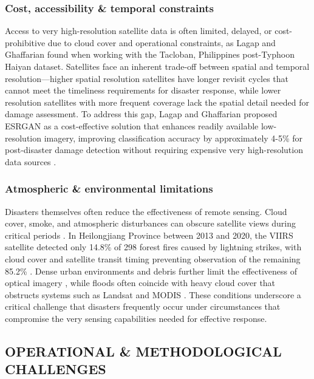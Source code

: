 \documentclass[conference,a4paper]{IEEEtran}
\begin{document}
\subsubsection{\textbf{Cost, accessibility \& temporal constraints}}
Access to very high-resolution satellite data is often limited, delayed, or cost-prohibitive due to cloud cover and operational constraints, as Lagap and Ghaffarian found when working with the Tacloban, Philippines post-Typhoon Haiyan dataset. Satellites face an inherent trade-off between spatial and temporal resolution—higher spatial resolution satellites have longer revisit cycles that cannot meet the timeliness requirements for disaster response, while lower resolution satellites with more frequent coverage lack the spatial detail needed for damage assessment. To address this gap, Lagap and Ghaffarian proposed ESRGAN as a cost-effective solution that enhances readily available low-resolution imagery, improving classification accuracy by approximately 4-5\% for post-disaster damage detection without requiring expensive very high-resolution data sources \cite{lagapEnhancingPostDisasterDamage2025}.

\subsubsection{\textbf{Atmospheric \& environmental limitations}}
Disasters themselves often reduce the effectiveness of remote sensing. Cloud cover, smoke, and atmospheric disturbances can obscure satellite views during critical periods \cite{lagapEnhancingPostDisasterDamage2025}. In Heilongjiang Province between 2013 and 2020, the VIIRS satellite detected only 14.8\% of 298 forest fires caused by lightning strikes, with cloud cover and satellite transit timing preventing observation of the remaining 85.2\% \cite{jiaoForestFirePatterns2023}. Dense urban environments and debris further limit the effectiveness of optical imagery \cite{lagapEnhancingPostDisasterDamage2025}, while floods often coincide with heavy cloud cover that obstructs systems such as Landsat and MODIS \cite{teohExploringGenerativeAI2024}. These conditions underscore a critical challenge that disasters frequently occur under circumstances that compromise the very sensing capabilities needed for effective response.


\subsection{OPERATIONAL \& METHODOLOGICAL CHALLENGES}
\end{document}
